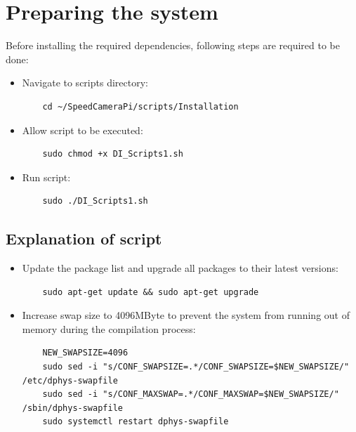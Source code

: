 \section{Preparing the system}

Before installing the required dependencies, following steps are required to be done:

\begin{itemize}
      \item Navigate to scripts directory:

            \begin{lstlisting}
    cd ~/SpeedCameraPi/scripts/Installation
    \end{lstlisting}

      \item Allow script to be executed:

            \begin{lstlisting}
    sudo chmod +x DI_Scripts1.sh
    \end{lstlisting}

      \item Run script:

            \begin{lstlisting}
    sudo ./DI_Scripts1.sh
    \end{lstlisting}
\end{itemize}

\subsection{Explanation of script}

\begin{itemize}
      \item Update the package list and upgrade all packages to their latest versions:

            \begin{lstlisting}
    sudo apt-get update && sudo apt-get upgrade
\end{lstlisting}

      \item Increase swap size to 4096MByte to prevent the system from running out of
            memory during the compilation process:

            \begin{lstlisting}
    NEW_SWAPSIZE=4096
    sudo sed -i "s/CONF_SWAPSIZE=.*/CONF_SWAPSIZE=$NEW_SWAPSIZE/" /etc/dphys-swapfile
    sudo sed -i "s/CONF_MAXSWAP=.*/CONF_MAXSWAP=$NEW_SWAPSIZE/" /sbin/dphys-swapfile
    sudo systemctl restart dphys-swapfile
\end{lstlisting}
\end{itemize}

